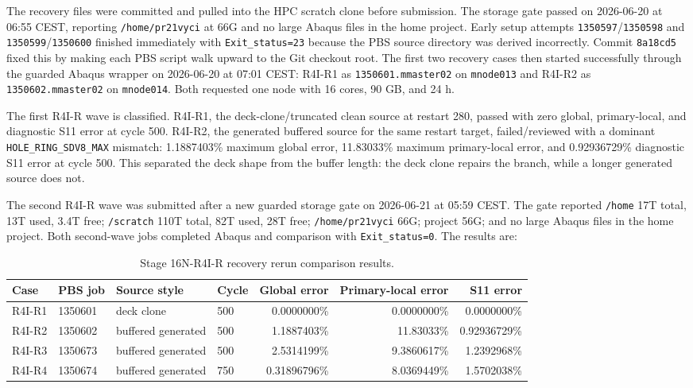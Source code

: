 \documentclass[11pt,a4paper]{article}
\newcommand{\code}[1]{\texttt{#1}}
\begin{document}
The recovery files were committed and pulled into the HPC scratch clone before submission. The storage gate passed on 2026-06-20 at 06:55 CEST, reporting \code{/home/pr21vyci} at 66G and no large Abaqus files in the home project. Early setup attempts \code{1350597}/\code{1350598} and \code{1350599}/\code{1350600} finished immediately with \code{Exit\_status=23} because the PBS source directory was derived incorrectly. Commit \code{8a18cd5} fixed this by making each PBS script walk upward to the Git checkout root. The first two recovery cases then started successfully through the guarded Abaqus wrapper on 2026-06-20 at 07:01 CEST: R4I-R1 as \code{1350601.mmaster02} on \code{mnode013} and R4I-R2 as \code{1350602.mmaster02} on \code{mnode014}. Both requested one node with 16 cores, 90 GB, and 24 h.

The first R4I-R wave is classified. R4I-R1, the deck-clone/truncated clean source at restart 280, passed with zero global, primary-local, and diagnostic S11 error at cycle 500. R4I-R2, the generated buffered source for the same restart target, failed/reviewed with a dominant \code{HOLE\_RING\_SDV8\_MAX} mismatch: 1.1887403\% maximum global error, 11.83033\% maximum primary-local error, and 0.92936729\% diagnostic S11 error at cycle 500. This separated the deck shape from the buffer length: the deck clone repairs the branch, while a longer generated source does not.

The second R4I-R wave was submitted after a new guarded storage gate on 2026-06-21 at 05:59 CEST. The gate reported \code{/home} 17T total, 13T used, 3.4T free; \code{/scratch} 110T total, 82T used, 28T free; \code{/home/pr21vyci} 66G; project 56G; and no large Abaqus files in the home project. Both second-wave jobs completed Abaqus and comparison with \code{Exit\_status=0}. The results are:

\begin{table}[H]
\centering
\caption{Stage 16N-R4I-R recovery rerun comparison results.}
\begin{tabular}{llllrrr}
\toprule
Case & PBS job & Source style & Cycle & Global error & Primary-local error & S11 error \\
\midrule
R4I-R1 & 1350601 & deck clone & 500 & 0.0000000\% & 0.0000000\% & 0.0000000\% \\
R4I-R2 & 1350602 & buffered generated & 500 & 1.1887403\% & 11.83033\% & 0.92936729\% \\
R4I-R3 & 1350673 & buffered generated & 500 & 2.5314199\% & 9.3860617\% & 1.2392968\% \\
R4I-R4 & 1350674 & buffered generated & 750 & 0.31896796\% & 8.0369449\% & 1.5702038\% \\
\bottomrule
\end{tabular}
\end{table}
\end{document}
